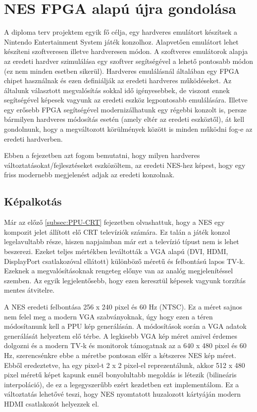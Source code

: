 \chapter{NES FPGA alapú újra gondolása}

A diploma terv projektem egyik fő célja, egy hardveres emulátort készítsek a Nintendo Entertainment System játék konzolhoz. Alapvetően emulátort lehet készíteni szoftveresen illetve hardveresen módon. A szoftveres emulátorok alapja az eredeti hardver szimulálása egy szoftver segítségével a lehető pontosabb módon (ez nem minden esetben sikerül). Hardveres emulálásnál általában egy FPGA chipet használnak és ezen definiálják az eredeti hardveres működéseket. Az általunk választott megvalósítás sokkal idő igényesebbek, de viszont ennek segítségével képesek vagyunk az eredeti eszköz legpontosabb emulálására. Illetve egy erősebb FPGA segítségével modernizálhatunk egy régebbi konzolt is, persze bármilyen hardveres módosítás esetén (amely eltér az eredeti eszköztől), át kell gondolnunk, hogy a megváltozott körülmények között is minden működni fog-e az eredeti hardverben. 

Ebben a fejezetben azt fogom bemutatni, hogy milyen hardveres változtatásokat/fejlesztéseket eszközöltem, az eredeti NES-hez képest, hogy egy friss modernebb megjelenést adjak az eredeti konzolnak.

\section{Képalkotás}

Már az előző \ref{subsec:PPU-CRT} fejezetben olvashattuk, hogy a NES egy kompozit jelet állított elő CRT televíziók számára. Ez talán a játék konzol legelavultabb része, hiszen napjaimban már ezt a televízió típust nem is lehet beszerezi. Ezeket teljes mértékben leváltották a VGA alapú (DVI, HDMI, DisplayPort csatlakozóval ellátott) különböző méretű és felbontású lapos TV-k. Ezeknek a megvalósításoknak rengeteg előnye van az analóg megjelenítéssel szemben. Az egyik legjelentősebb, hogy ezen keresztül képesek vagyunk torzítás mentes átvitelre.

A NES eredeti felbontása 256 x 240 pixel és 60 Hz (NTSC). Ez a  méret sajnos nem felel meg a modern VGA szabványoknak, úgy hogy ezen a téren módosítanunk kell a PPU kép generálásán. A módosítások során a VGA adatok generálását helyeztem elő térbe. A legkisebb VGA kép méret amivel érdemes dolgozni és a modern TV-k és monitorok támogatnak az a 640 x 480 pixel és 60 Hz, szerencsénkre ebbe a méretbe pontosan elfér a kétszeres NES kép méret. Ebből eredeztetve, ha egy pixel-t 2 x 2 pixel-el reprezentálunk, akkor 512 x 480 pixel méretű képet kapunk ennél bonyolultabb megoldás is létezik (bilineáris interpoláció), de ez a legegyszerűbb ezért kezdetben ezt implementálom. Ez a változtatás lehetővé teszi, hogy NES nyomtatott huzalozott kártyáján modern HDMI csatlakozót helyezzek el. 

